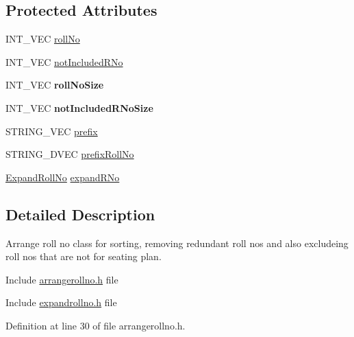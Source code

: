 \subsection*{\-Protected \-Attributes}
\begin{DoxyCompactItemize}
\item 
\-I\-N\-T\-\_\-\-V\-E\-C \hyperlink{classArrangeRollNo_ad75d3ee3f709606da5b4871098c3e978}{roll\-No}
\item 
\-I\-N\-T\-\_\-\-V\-E\-C \hyperlink{classArrangeRollNo_a1f6740950e3180731b74c3ecdc19b98c}{not\-Included\-R\-No}
\item 
\hypertarget{classArrangeRollNo_ab39f82c658365388d106b3dcc18e69fb}{\-I\-N\-T\-\_\-\-V\-E\-C {\bfseries roll\-No\-Size}}\label{classArrangeRollNo_ab39f82c658365388d106b3dcc18e69fb}

\item 
\hypertarget{classArrangeRollNo_a728b87c54815f5393e93da5909ed90b2}{\-I\-N\-T\-\_\-\-V\-E\-C {\bfseries not\-Included\-R\-No\-Size}}\label{classArrangeRollNo_a728b87c54815f5393e93da5909ed90b2}

\item 
\-S\-T\-R\-I\-N\-G\-\_\-\-V\-E\-C \hyperlink{classArrangeRollNo_ac70b1f6e601cc5786ef339a38ae18c6f}{prefix}
\item 
\-S\-T\-R\-I\-N\-G\-\_\-D\-V\-E\-C \hyperlink{classArrangeRollNo_aa0401159b5d59c7afe77980a391a9a0a}{prefix\-Roll\-No}
\item 
\hyperlink{classExpandRollNo}{\-Expand\-Roll\-No} \hyperlink{classArrangeRollNo_a7ddd59b57f85cf6fea265d38c284df92}{expand\-R\-No}
\end{DoxyCompactItemize}


\subsection{\-Detailed \-Description}
\-Arrange roll no class for sorting, removing redundant roll nos and also excludeing roll nos that are not for seating plan. 

\-Include \hyperlink{arrangerollno_8h}{arrangerollno.\-h} file

\-Include \hyperlink{expandrollno_8h}{expandrollno.\-h} file 

\-Definition at line 30 of file arrangerollno.\-h.



